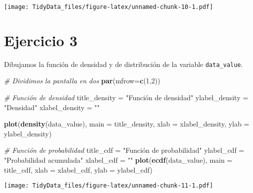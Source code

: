 \documentclass[12pt,spanish,]{article}
\newenvironment{Shaded}{\begin{snugshade}}{\end{snugshade}}
\newcommand{\KeywordTok}[1]{\textcolor[rgb]{0.13,0.29,0.53}{\textbf{{#1}}}}
\newcommand{\DataTypeTok}[1]{\textcolor[rgb]{0.13,0.29,0.53}{{#1}}}
\newcommand{\DecValTok}[1]{\textcolor[rgb]{0.00,0.00,0.81}{{#1}}}
\newcommand{\StringTok}[1]{\textcolor[rgb]{0.31,0.60,0.02}{{#1}}}
\newcommand{\CommentTok}[1]{\textcolor[rgb]{0.56,0.35,0.01}{\textit{{#1}}}}
\newcommand{\NormalTok}[1]{{#1}}
\begin{document}
\texttt{[image: TidyData\_files/figure-latex/unnamed-chunk-10-1.pdf]}

\section{Ejercicio 3}\label{ejercicio-3}

Dibujamos la función de densidad y de distribución de la variable
\texttt{data\_value}.

\begin{Shaded}
\begin{Highlighting}[]
\CommentTok{# Dividimos la pantalla en dos}
\KeywordTok{par}\NormalTok{(}\DataTypeTok{mfrow=}\KeywordTok{c}\NormalTok{(}\DecValTok{1}\NormalTok{,}\DecValTok{2}\NormalTok{))}

\CommentTok{# Función de densidad}
\NormalTok{title_density =}\StringTok{ "Función de densidad"}
\NormalTok{ylabel_density =}\StringTok{ "Densidad"}
\NormalTok{xlabel_density =}\StringTok{ ""}

\KeywordTok{plot}\NormalTok{(}\KeywordTok{density}\NormalTok{(data_value),}
     \DataTypeTok{main =} \NormalTok{title_density,}
     \DataTypeTok{xlab =} \NormalTok{xlabel_density,}
     \DataTypeTok{ylab =} \NormalTok{ylabel_density)}

\CommentTok{# Función de probabilidad}
\NormalTok{title_cdf =}\StringTok{ "Función de probabilidad"}
\NormalTok{ylabel_cdf =}\StringTok{ "Probabilidad acumulada"}
\NormalTok{xlabel_cdf =}\StringTok{ ""}
\KeywordTok{plot}\NormalTok{(}\KeywordTok{ecdf}\NormalTok{(data_value),}
     \DataTypeTok{main =} \NormalTok{title_cdf,}
     \DataTypeTok{xlab =} \NormalTok{xlabel_cdf,}
     \DataTypeTok{ylab =} \NormalTok{ylabel_cdf)}
\end{Highlighting}
\end{Shaded}

\texttt{[image: TidyData\_files/figure-latex/unnamed-chunk-11-1.pdf]}
\end{document}
